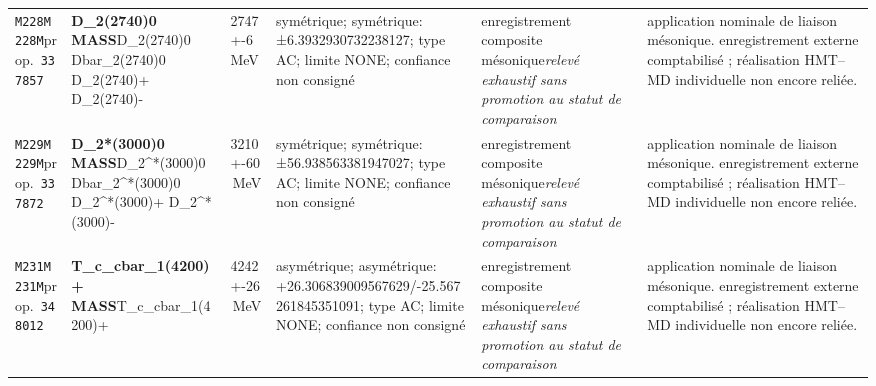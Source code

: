 \begin{landscape}
\begin{longtable}{L{1.85cm}L{4.45cm}L{2.35cm}L{4.05cm}L{3.35cm}L{7.15cm}}
\texttt{M228}\newline \texttt{M228M}\newline prop.\ \texttt{337857} & \textbf{D\_\allowbreak{}2(2740)0 MASS}\newline D\_\allowbreak{}2(2740)0 \textbar{}\allowbreak{} Dbar\_\allowbreak{}2(2740)0 \textbar{}\allowbreak{} D\_\allowbreak{}2(2740)+ \textbar{}\allowbreak{} D\_\allowbreak{}2(2740)- & 2747+-6\,MeV & symétrique; symétrique: ±6.3932930732238127; type AC; limite NONE; confiance non consigné & enregistrement composite mésonique\newline \emph{relevé exhaustif sans promotion au statut de comparaison} & application nominale de liaison mésonique. enregistrement externe comptabilisé ; réalisation HMT--MD individuelle non encore reliée. \\
\texttt{M229}\newline \texttt{M229M}\newline prop.\ \texttt{337872} & \textbf{D\_\allowbreak{}2*(3000)0 MASS}\newline D\_\allowbreak{}2\textasciicircum{}*(3000)0 \textbar{}\allowbreak{} Dbar\_\allowbreak{}2\textasciicircum{}*(3000)0 \textbar{}\allowbreak{} D\_\allowbreak{}2\textasciicircum{}*(3000)+ \textbar{}\allowbreak{} D\_\allowbreak{}2\textasciicircum{}*(3000)- & 3210+-60\,MeV & symétrique; symétrique: ±56.938563381947027; type AC; limite NONE; confiance non consigné & enregistrement composite mésonique\newline \emph{relevé exhaustif sans promotion au statut de comparaison} & application nominale de liaison mésonique. enregistrement externe comptabilisé ; réalisation HMT--MD individuelle non encore reliée. \\
\texttt{M231}\newline \texttt{M231M}\newline prop.\ \texttt{348012} & \textbf{T\_\allowbreak{}c\_\allowbreak{}cbar\_\allowbreak{}1(4200)+ MASS}\newline T\_\allowbreak{}c\_\allowbreak{}cbar\_\allowbreak{}1(4200)+ & 4242+-26\,MeV & asymétrique; asymétrique: +26.306839009567629/-25.567261845351091; type AC; limite NONE; confiance non consigné & enregistrement composite mésonique\newline \emph{relevé exhaustif sans promotion au statut de comparaison} & application nominale de liaison mésonique. enregistrement externe comptabilisé ; réalisation HMT--MD individuelle non encore reliée. \\

\end{longtable}
\end{landscape}
